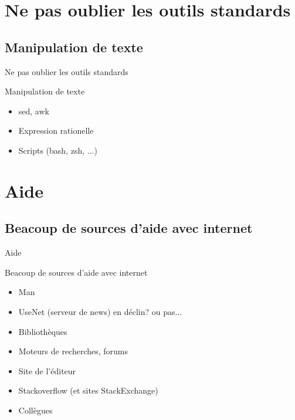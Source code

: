 \def\sectitle{Ne pas oublier les outils standards}
\section{\sectitle}
\def\subsectitle{Manipulation de texte}
\subsection{\subsectitle}
\begin{frame}{\sectitle}
    \begin{block}{\subsectitle}
        \begin{itemize}
            \item sed, awk
            \item Expression rationelle
            \item Scripts (bash, zsh, ...)
        \end{itemize}
    \end{block}
\end{frame}


\def\sectitle{Aide}
\section{\sectitle}
\def\subsectitle{Beacoup de sources d'aide avec internet}
\subsection{\subsectitle}
\begin{frame}{\sectitle}
    \begin{block}{\subsectitle}
        \begin{itemize}
            \item Man
            \item UseNet (serveur de news) en déclin? ou pas... 
            \item Bibliothèques
            \item Moteurs de recherches, forums
            \item Site de l'éditeur
            \item Stackoverflow (et sites StackExchange)
            \item Collègues
        \end{itemize}
    \end{block}
\end{frame}


